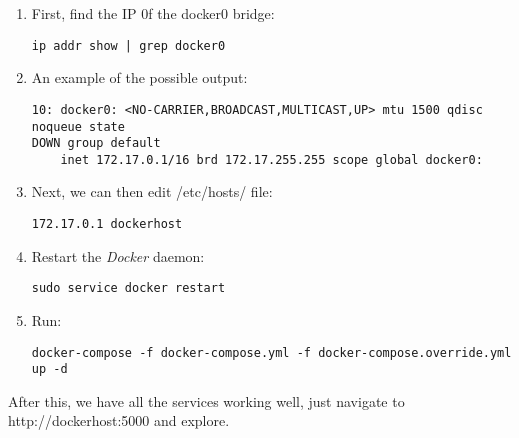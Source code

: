 \begin{enumerate}
    \item First, find the IP 0f the docker0 bridge:
    \begin{verbatim}
ip addr show | grep docker0
    \end{verbatim}
    \item An example of the possible output:
    \begin{verbatim}
10: docker0: <NO-CARRIER,BROADCAST,MULTICAST,UP> mtu 1500 qdisc noqueue state 
DOWN group default 
    inet 172.17.0.1/16 brd 172.17.255.255 scope global docker0:
    \end{verbatim}
    \item Next, we can then edit /etc/hosts/ file:
    \begin{verbatim}
172.17.0.1 dockerhost
    \end{verbatim}
    \item Restart the \textit{Docker} daemon:
    \begin{verbatim}
sudo service docker restart
    \end{verbatim}
    \item Run:
    \begin{verbatim}
docker-compose -f docker-compose.yml -f docker-compose.override.yml up -d
    \end{verbatim}
\end{enumerate}

After this, we have all the services working well, just navigate to http://dockerhost:5000 and explore.

